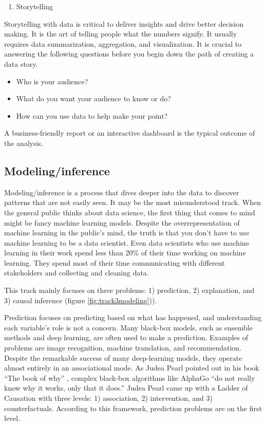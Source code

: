 \documentclass[
  12pt,
]{krantz}
\providecommand{\tightlist}{%
  \setlength{\itemsep}{0pt}\setlength{\parskip}{0pt}}
\begin{document}
\begin{enumerate}
\def\labelenumi{(\arabic{enumi})}
\setcounter{enumi}{2}
\tightlist
\item
  Storytelling
\end{enumerate}

Storytelling with data is critical to deliver insights and drive better decision making. It is the art of telling people what the numbers signify. It usually requires data summarization, aggregation, and visualization. It is crucial to answering the following questions before you begin down the path of creating a data story.

\begin{itemize}
\tightlist
\item
  Who is your audience?
\item
  What do you want your audience to know or do?
\item
  How can you use data to help make your point?
\end{itemize}

A business-friendly report or an interactive dashboard is the typical outcome of the analysis.

\hypertarget{modelinginference}{%
\subsection{Modeling/inference}\label{modelinginference}}

Modeling/inference is a process that dives deeper into the data to discover patterns that are not easily seen. It may be the most misunderstood track. When the general public thinks about data science, the first thing that comes to mind might be fancy machine learning models. Despite the overrepresentation of machine learning in the public's mind, the truth is that you don't have to use machine learning to be a data scientist. Even data scientists who use machine learning in their work spend less than 20\% of their time working on machine learning. They spend most of their time communicating with different stakeholders and collecting and cleaning data.

This track mainly focuses on three problems: 1) prediction, 2) explanation, and 3) causal inference (figure \ref{fig:track3modeling})).

Prediction focuses on predicting based on what has happened, and understanding each variable's role is not a concern. Many black-box models, such as ensemble methods and deep learning, are often used to make a prediction. Examples of problems are image recognition, machine translation, and recommendation. Despite the remarkable success of many deep-learning models, they operate almost entirely in an associational mode. As Judea Pearl pointed out in his book ``The book of why'' \citep{Judea2019}, complex black-box algorithms like AlphaGo ``do not really know why it works, only that it does.'' Judea Pearl came up with a Ladder of Causation \citep{Judea2019} with three levels: 1) association, 2) intervention, and 3) counterfactuals. According to this framework, prediction problems are on the first level.
\end{document}
